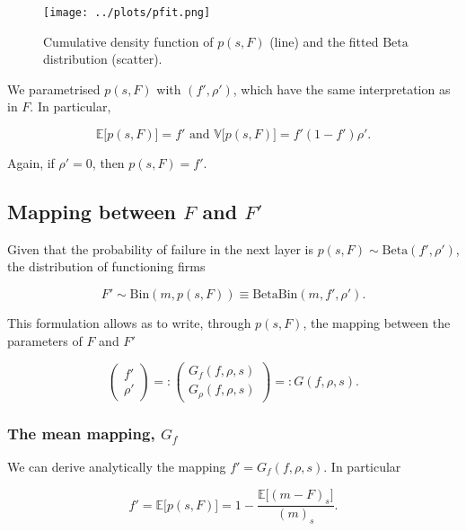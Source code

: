 \documentclass[american, abstract=on]{scrartcl}
\newcommand{\E}{\mathbb{E}}
\newcommand{\V}{\mathbb{V}}
\newcommand{\Beta}{\text{Beta}}
\newcommand{\Bin}{\text{Bin}}
\begin{document}
\begin{figure}[H]
    \centering
    \texttt{[image: ../plots/pfit.png]}
    \caption{Cumulative density function of $p(s, F)$ (line) and the fitted $\Beta$ distribution (scatter).}
    \label{fig:pfit}
\end{figure}

We parametrised $p(s, F)$ with $(f', \rho')$, which have the same interpretation as in $F$. In particular,

\begin{equation}
    \E\big[p(s, F)\big] = f' \text{ and } \V\big[p(s, F)\big] = f' (1 - f')\rho'.
\end{equation}

Again, if $\rho' = 0$, then $p(s, F) = f'$.

\subsection{Mapping between $F$ and $F'$}

Given that the probability of failure in the next layer is $p(s, F) \sim \Beta(f', \rho')$, the distribution of functioning firms 

\begin{equation}
    F' \sim \Bin(m, p(s, F)) \equiv \Beta\Bin(m, f', \rho').
\end{equation}

This formulation allows as to write, through $p(s, F)$, the mapping between the parameters of $F$ and $F'$

\begin{equation}
    \begin{pmatrix}
        f' \\ \rho'
    \end{pmatrix} =: \begin{pmatrix}
        G_f(f, \rho, s) \\ G_\rho(f, \rho, s)
    \end{pmatrix} =: G(f, \rho, s).
\end{equation}

\subsubsection{The mean mapping, $G_f$}

We can derive analytically the mapping $f' = G_f(f, \rho, s)$. In particular

\begin{equation}
    f' = \E\big[p(s, F)\big] = 1 - \frac{\E\big[(m - F)_s\big]}{(m)_s}.
\end{equation}
\end{document}
